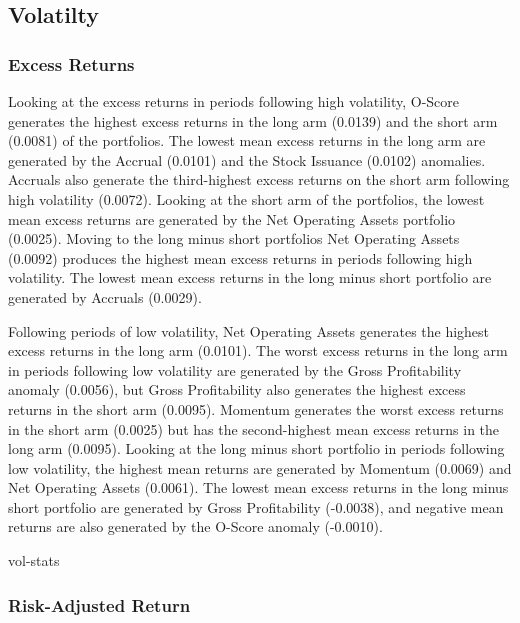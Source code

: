 \documentclass[12pt, a4paper, oneside]{article}
\begin{document}
\subsection{Volatilty}
\subsubsection{Excess Returns}
Looking at the excess returns in periods following high volatility, O-Score generates the highest excess returns in the long arm (0.0139) and the short arm (0.0081) of the portfolios. The lowest mean excess returns in the long arm are generated by the Accrual (0.0101) and the Stock Issuance (0.0102) anomalies. Accruals also generate the third-highest excess returns on the short arm following high volatility (0.0072). Looking at the short arm of the portfolios, the lowest mean excess returns are generated by the Net Operating Assets portfolio (0.0025). Moving to the long minus short portfolios Net Operating Assets (0.0092) produces the highest mean excess returns in periods following high volatility. The lowest mean excess returns in the long minus short portfolio are generated by Accruals (0.0029).

Following periods of low volatility, Net Operating Assets generates the highest excess returns in the long arm (0.0101). The worst excess returns in the long arm in periods following low volatility are generated by the Gross Profitability anomaly (0.0056), but Gross Profitability also generates the highest excess returns in the short arm (0.0095).  Momentum generates the worst excess returns in the short arm (0.0025) but has the second-highest mean excess returns in the long arm (0.0095). Looking at the long minus short portfolio in periods following low volatility, the highest mean returns are generated by Momentum (0.0069) and Net Operating Assets (0.0061). The lowest mean excess returns in the long minus short portfolio are generated by Gross Profitability (-0.0038), and negative mean returns are also generated by the O-Score anomaly (-0.0010).

{vol-stats}

\subsubsection{Risk-Adjusted Return}
\end{document}
